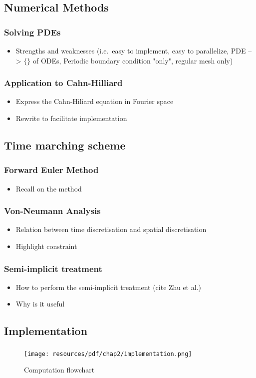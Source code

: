 \subsection{Numerical Methods}
    \subsubsection{Solving PDEs}
    \begin{itemize}
        \item Strengths and weaknesses (i.e.\ easy to implement, easy to parallelize, PDE --> $\{\}$ of ODEs, Periodic boundary condition "only", regular mesh only)
    \end{itemize}
    \subsubsection{Application to Cahn-Hilliard}
    \begin{itemize}
        \item Express the Cahn-Hiliard equation in Fourier space
        \item Rewrite to facilitate implementation
    \end{itemize}
\subsection{Time marching scheme}
    \subsubsection{Forward Euler Method}
    \begin{itemize}
        \item Recall on the method
    \end{itemize}
    \subsubsection{Von-Neumann Analysis}
    \begin{itemize}
        \item Relation between time discretisation and spatial discretisation
        \item Highlight constraint
    \end{itemize}
    \subsubsection{Semi-implicit treatment}
    \begin{itemize}
        \item How to perform the semi-implicit treatment (cite Zhu et al.)
        \item Why is it useful
    \end{itemize}
\subsection{Implementation}
    \subsubsection{}
    \begin{figure}[H]
        \centering
        \texttt{[image: resources/pdf/chap2/implementation.png]}
        \caption{Computation flowchart}
        \label{fig:t}
    \end{figure}

